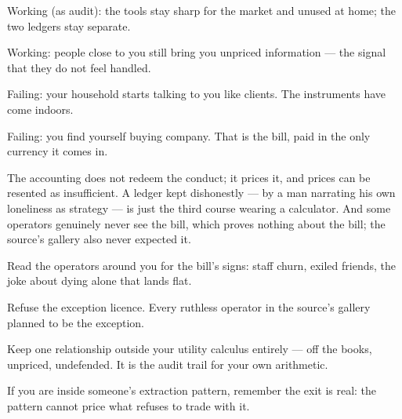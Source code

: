 \begin{feedback}
  \item Working (as audit): the tools stay sharp for the market and unused at home; the two ledgers stay separate.
  \item Working: people close to you still bring you unpriced information --- the signal that they do not feel handled.
  \item Failing: your household starts talking to you like clients. The instruments have come indoors.
  \item Failing: you find yourself buying company. That is the bill, paid in the only currency it comes in.
\end{feedback}
\begin{failure}
The accounting does not redeem the conduct; it prices it, and prices can be resented as insufficient. A ledger kept dishonestly --- by a man narrating his own loneliness as strategy --- is just the third course wearing a calculator. And some operators genuinely never see the bill, which proves nothing about the bill; the source's gallery also never expected it.
\end{failure}
\begin{countermeasures}
  \item Read the operators around you for the bill's signs: staff churn, exiled friends, the joke about dying alone that lands flat.
  \item Refuse the exception licence. Every ruthless operator in the source's gallery planned to be the exception.
  \item Keep one relationship outside your utility calculus entirely --- off the books, unpriced, undefended. It is the audit trail for your own arithmetic.
  \item If you are inside someone's extraction pattern, remember the exit is real: the pattern cannot price what refuses to trade with it.
\end{countermeasures}

\seesources
{}
